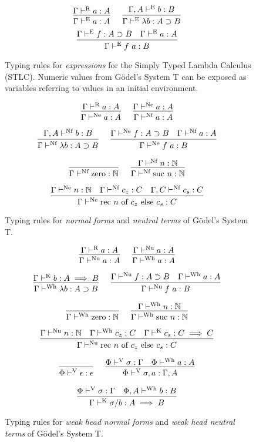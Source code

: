 \documentclass[preprint,authoryear]{sigplanconf}
\def\turnstyle{\vdash}
\def\asc{:}
\def\arr{\supset}
\def\nat{\mathbb{N}}
\def\emp{\epsilon}
\def\zero{\con{zero}}
\newcommand{\suc}[1]{\con{suc}~#1}
\newcommand{\rec}[3]{\con{rec}~#1~\con{of}~#2~\con{else}~#3}
\newcommand{\con}[1]{\textmd{#1}}
\newcommand{\turn}[1]{\turnstyle^\con{#1}}
\newcommand{\typr}[2]{\Gamma \turn{R}  #1 \asc #2}
\newcommand{\type}[2]{\ctype{\Gamma}{#1}{#2}}
\newcommand{\ctype}[3]{#1 \turn{E}  #2 \asc #3}
\newcommand{\typnf}[2]{\ctypnf{\Gamma}{#1}{#2}}
\newcommand{\ctypnf}[3]{#1 \turn{Nf}  #2 \asc #3}
\newcommand{\typne}[2]{\Gamma \turn{Ne}  #1 \asc #2}
\newcommand{\typk}[3]{\Gamma \turn{K}  #1 \asc #2 \implies #3}
\newcommand{\typv}[2]{\Phi \turn{V}  #1 \asc #2}
\newcommand{\typwh}[2]{\ctypwh{\Gamma}{#1}{#2}}
\newcommand{\ctypwh}[3]{#1 \turn{Wh}  #2 \asc #3}
\newcommand{\typnu}[2]{\Gamma \turn{Nu}  #1 \asc #2}
\begin{document}
\begin{figure}[t!]
\caption{
Typing rules for \textit{expressions} for the Simply Typed Lambda
Calculus (STLC). Numeric values from G{\"o}del's System T can be
exposed as variables referring to values in an initial environment.
}
$$
\infer
  []
  {\type{a}{A}}
{
  \typr{a}{A}
}
\quad
\infer
  []
  {\type{\lambda b}{A \arr B}}
{
  \ctype{\Gamma, A}{b}{B}
}
$$
$$
\infer
  []
  {\type{f~a}{B}}
{
  \type{f}{A \arr B}
  &
  \type{a}{A}
}
$$
\label{fig:type:exp}
\end{figure}

\begin{figure}[t!]
\caption{
Typing rules for \textit{normal forms} and \textit{neutral terms} of G{\"o}del's System T.
}
$$
\infer
  []
  {\typne{a}{A}}
{
  \typr{a}{A}
}
\quad
\infer
  []
  {\typnf{a}{A}}
{
  \typne{a}{A}
}
$$

$$
\infer
  []
  {\typnf{\lambda b}{A \arr B}}
{
  \ctypnf{\Gamma, A}{b}{B}
}
\quad
\infer
  []
  {\typne{f~a}{B}}
{
  \typne{f}{A \arr B}
  &
  \typnf{a}{A}
}
$$

$$
\infer
  []
  {\typnf{\zero}{\nat}}
{
}
\quad
\infer
  []
  {\typnf{\suc{n}}{\nat}}
{
  \typnf{n}{\nat}
}
$$

$$
\infer
  []
  {\typne{\rec{n}{c_z}{c_s}}{C}}
{
  \typne{n}{\nat}
  &
  \typnf{c_z}{C}
  &
  \ctypnf{\Gamma, C}{c_s}{C}
}
$$

\label{fig:type:nf}
\end{figure}

\begin{figure}[t!]
\caption{
Typing rules for \textit{weak head normal forms} and
\textit{weak head neutral terms} of G{\"o}del's System T.
}

$$
\infer
  []
  {\typnu{a}{A}}
{
  \typr{a}{A}
}
\quad
\infer
  []
  {\typwh{a}{A}}
{
  \typnu{a}{A}
}
$$

$$
\infer
  []
  {\typwh{\lambda b}{A \arr B}}
{
  \typk{b}{A}{B}
}
\quad
\infer
  []
  {\typnu{f~a}{B}}
{
  \typnu{f}{A \arr B}
  &
  \typwh{a}{A}
}
$$

$$
\infer
  []
  {\typwh{\zero}{\nat}}
{
}
\quad
\infer
  []
  {\typwh{\suc{n}}{\nat}}
{
  \typwh{n}{\nat}
}
$$

$$
\infer
  []
  {\typnu{\rec{n}{c_z}{c_s}}{C}}
{
  \typnu{n}{\nat}
  &
  \typwh{c_z}{C}
  &
  \typk{c_s}{C}{C}
}
$$

$$
\infer
  []
  {\typv{\emp}{\emp}}
{
}
\quad
\infer
  []
  {\typv{\sigma, a}{\Gamma, A}}
{
  \typv{\sigma}{\Gamma}
  &
  \ctypwh{\Phi}{a}{A}
}
$$

$$
\infer
  []
  {\typk{\sigma / b}{A}{B}}
{
  \typv{\sigma}{\Gamma}
  &
  \ctypwh{\Phi, A}{b}{B}
}
$$

\label{fig:type:wh}
\end{figure}
\end{document}
